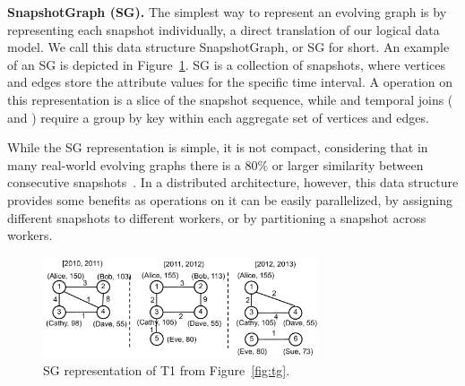{\bf SnapshotGraph (SG).} The simplest way to represent an evolving
graph is by representing each snapshot individually, a direct
translation of our logical data model.  We call this data structure
SnapshotGraph, or SG for short. An example of an SG is depicted in
Figure~\ref{fig:sgp}.  SG is a collection of snapshots, where vertices
and edges store the attribute values for the specific time interval.
A  operation on this representation is a slice of the
snapshot sequence, while  and temporal joins
( and ) require a group by key within each
aggregate set of vertices and edges.

While the SG representation is simple, it is not compact, considering
that in many real-world evolving graphs there is a 80\% or larger
similarity between consecutive
snapshots~\cite{DBLP:journals/tos/MiaoHLWYZPCC15}.  In a distributed
architecture, however, this data structure provides some benefits as
operations on it can be easily parallelized, by assigning different
snapshots to different workers, or by partitioning a snapshot across
workers.  

\begin{figure}[t!]
\includegraphics[width=3.2in]{figs/sgp.pdf}
\caption{SG representation of T1 from Figure~\ref{fig:tg}.}
\label{fig:sgp}
\end{figure}

